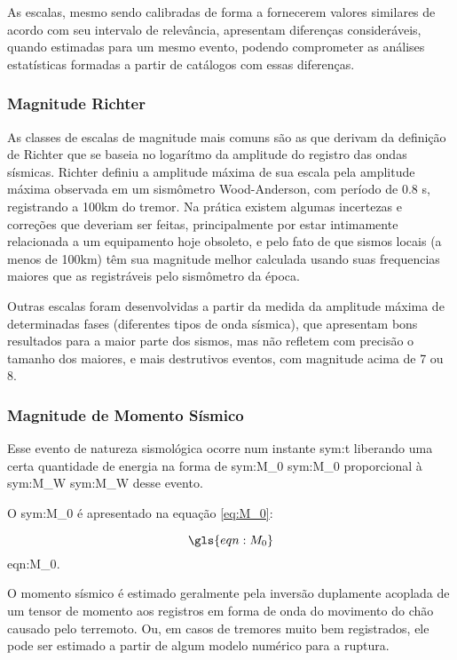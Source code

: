 As escalas, mesmo sendo calibradas de forma a fornecerem valores similares de acordo com seu
intervalo de relevância, apresentam diferenças consideráveis, quando estimadas para um mesmo evento,
podendo comprometer as análises estatísticas formadas a partir de catálogos com essas diferenças.


\subsubsection{Magnitude Richter}
\label{sec:magnitude_richter}

As classes de escalas de magnitude mais comuns são as que derivam da definição de Richter \citep{richter_1935}
que se baseia no logarítmo da amplitude do registro das ondas sísmicas. Richter definiu a amplitude máxima de sua
escala pela amplitude máxima observada em um sismômetro Wood-Anderson, com período de 0.8 s, registrando a 100km 
do tremor. Na prática existem algumas incertezas e correções que deveriam ser feitas, principalmente por estar intimamente 
relacionada a um equipamento hoje obsoleto, e pelo fato de que sismos locais (a menos de 100km) têm sua magnitude melhor calculada
usando suas frequencias maiores que as registráveis pelo sismômetro da época.


Outras escalas foram desenvolvidas a partir da medida da amplitude máxima de determinadas fases 
(diferentes tipos de onda sísmica), que apresentam bons resultados para a maior parte dos sismos,
mas não refletem com precisão o tamanho dos maiores, e mais destrutivos eventos, com magnitude acima de 7 ou 8.


\subsubsection{Magnitude de Momento Sísmico }
\label{sec:risco_sismico}

Esse evento de natureza sismológica ocorre num
instante \gls{sym:t} liberando uma certa quantidade de energia na forma de \glsdesc{sym:M_0}
\gls{sym:M_0} proporcional à \glsdesc{sym:M_W} \gls{sym:M_W} desse evento.

O \glsdesc{sym:M_0} é apresentado na equação \ref{eq:M_0}:

\begin{equation}
	\gls{eqn:M_0}
	\label{eq:M_0}
\end{equation}
\glsdesc*{eqn:M_0}.

O momento sísmico é estimado geralmente pela inversão duplamente acoplada de um tensor de momento aos registros em 
forma de onda do movimento do chão causado pelo terremoto. Ou, em casos de tremores muito bem registrados, ele pode
ser estimado a partir de algum modelo numérico para a ruptura.

